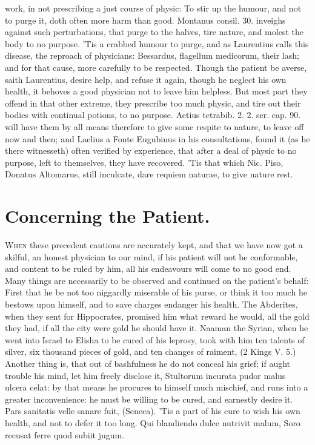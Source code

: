 {work, in not prescribing a just course of physic: To stir up the
humour, and not to purge it, doth often more harm than good. Montanus
consil. 30. inveighs against such perturbations, that purge to the
halves, tire nature, and molest the body to no purpose. 'Tis a crabbed
humour to purge, and as Laurentius calls this disease, the reproach of
physicians: Bessardus, flagellum medicorum, their lash; and for that
cause, more carefully to be respected. Though the patient be averse,
saith Laurentius, desire help, and refuse it again, though he neglect
his own health, it behoves a good physician not to leave him helpless.
But most part they offend in that other extreme, they prescribe too
much physic, and tire out their bodies with continual potions, to no
purpose. Aetius tetrabib. 2. 2. ser. cap. 90. will have them by all
means therefore to give some respite to nature, to leave off now
and then; and Laelius a Fonte Eugubinus in his consultations, found it
(as he there witnesseth) often verified by experience, that after
a deal of physic to no purpose, left to themselves, they have
recovered. 'Tis that which Nic. Piso, Donatus Altomarus, still
inculcate, dare requiem naturae, to give nature rest.

\section{Concerning the Patient.}

\lettrine{W}{hen} these precedent cautions are accurately kept, and that we have now
got a skilful, an honest physician to our mind, if his patient will not
be conformable, and content to be ruled by him, all his endeavours will
come to no good end. Many things are necessarily to be observed and
continued on the patient's behalf: First that he be not too niggardly
miserable of his purse, or think it too much he bestows upon himself,
and to save charges endanger his health. The Abderites, when they sent
for Hippocrates, promised him what reward he would, all the
gold they had, if all the city were gold he should have it. Naaman the
Syrian, when he went into Israel to Elisha to be cured of his leprosy,
took with him ten talents of silver, six thousand pieces of gold, and
ten changes of raiment, (2 Kings V. 5.) Another thing is, that out of
bashfulness he do not conceal his grief; if aught trouble his mind, let
him freely disclose it, Stultorum incurata pudor malus ulcera celat: by
that means he procures to himself much mischief, and runs into a
greater inconvenience: he must be willing to be cured, and earnestly
desire it. Pars sanitatis velle sanare fuit, (Seneca). 'Tis a part of
his cure to wish his own health, and not to defer it too long.
Qui blandiendo dulce nutrivit malum,
Soro recusat ferre quod subiit jugum.


}
